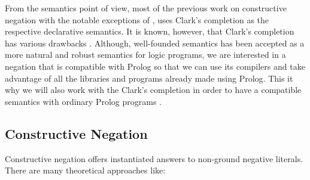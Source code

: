 \documentclass{tlp}
\begin{document}
From the semantics point of view, most of the previous work on constructive
negation with the notable exceptions of \cite{Damasio,Drabent,Przymusinski2},
uses Clark's completion as the respective declarative semantics. It is known,
however, that Clark's completion has various drawbacks
\cite{Przymusinski3}. Although, well-founded semantics \cite{VGelder} has been
accepted as a more natural and robust semantics for logic programs, we are
interested in a negation that is compatible with Prolog so that we can use its
compilers and take advantage of all the libraries and programs already
made using
Prolog. This it why we will also work with the Clark's completion in
order to have a compatible semantics with ordinary Prolog programs .

\subsection{Constructive Negation}

Constructive negation offers instantiated answers to non-ground negative
literals. There are many theoretical approaches like:
\end{document}
